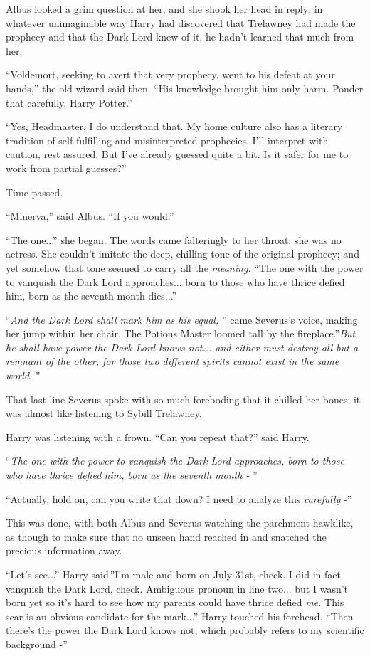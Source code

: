 Albus looked a grim question at her, and she shook her head in reply; in
whatever unimaginable way Harry had discovered that Trelawney had made
the prophecy and that the Dark Lord knew of it, he hadn't learned that
much from her.

``Voldemort, seeking to avert that very prophecy, went to his defeat at
your hands,'' the old wizard said then. ``His knowledge brought him only
harm. Ponder that carefully, Harry Potter.''

``Yes, Headmaster, I do understand that. My home culture also has a
literary tradition of self-fulfilling and misinterpreted prophecies.
I'll interpret with caution, rest assured. But I've already guessed
quite a bit. Is it safer for me to work from partial guesses?''

Time passed.

``Minerva,'' said Albus. ``If you would.''

``The one...'' she began. The words came falteringly to her throat;
she was no actress. She couldn't imitate the deep, chilling tone of the
original prophecy; and yet somehow that tone seemed to carry all the
\emph{meaning.} ``The one with the power to vanquish the Dark Lord
approaches... born to those who have thrice defied him, born as the
seventh month dies...''

``\emph{And the Dark Lord shall mark him as his equal,} '' came Severus's
voice, making her jump within her chair. The Potions Master loomed tall
by the fireplace.''\emph{But he shall have power the Dark Lord knows
not... and either must destroy all but a remnant of the other, for
those two different spirits cannot exist in the same world.} ''

That last line Severus spoke with so much foreboding that it chilled her
bones; it was almost like listening to Sybill Trelawney.

Harry was listening with a frown. ``Can you repeat that?'' said Harry.

``\emph{The one with the power to vanquish the Dark Lord approaches, born
to those who have thrice defied him, born as the seventh month -} ''

``Actually, hold on, can you write that down? I need to analyze this
\emph{carefully} -''

This was done, with both Albus and Severus watching the parchment
hawklike, as though to make sure that no unseen hand reached in and
snatched the precious information away.

``Let's see...'' Harry said.''I'm male and born on July 31st,
check. I did in fact vanquish the Dark Lord, check. Ambiguous pronoun in
line two... but I wasn't born yet so it's hard to see how my
parents could have thrice defied \emph{me.} This scar is an obvious
candidate for the mark...'' Harry touched his forehead. ``Then
there's the power the Dark Lord knows not, which probably refers to my
scientific background -''

